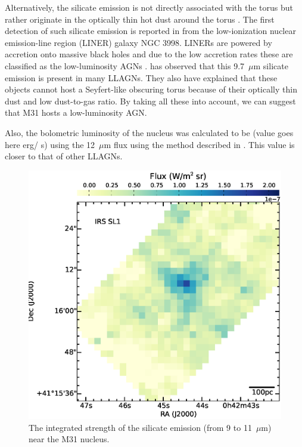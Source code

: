  Alternatively, the silicate emission is not directly associated with the torus but rather originate in the optically thin hot dust around the torus \citep{Mason2012}. 
 The first detection of such silicate emission is reported in \citet{Sturm2005} from the low-ionization nuclear emission-line region (LINER) galaxy NGC 3998. 
 LINERs are powered by accretion onto massive black holes and due to the low accretion rates these are classified as the low-luminosity AGNs \citep{Kewley2006}. 
 \citealt{Mason2012} has observed that this 9.7~$\mu$m silicate emission is present in many LLAGNs. They also have explained that these objects cannot 
 host a Seyfert-like obscuring torus because of their optically thin dust and low dust-to-gas ratio. By taking all these into account, we can suggest that M31 
 hosts a low-luminosity AGN. 

 
Also, the bolometric luminosity of the nucleus was calculated to be (value goes here erg/ s) using the 12~$\mu$m flux using the method described in \citet{luminosity}. This value is closer to that of other LLAGNs.


\begin{figure}
\centering
\includegraphics[scale = 0.3]{./NUCsilicate.eps}
\caption{The integrated strength of the silicate emission (from 9 to 11~$\mu$m) near the M31 nucleus.}
\label{silicate}
\end{figure}
